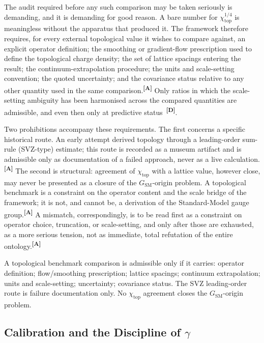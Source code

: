 \documentclass[12pt,a4paper,twoside]{article}
\theoremstyle{plain}
\theoremstyle{definition}
\theoremstyle{remark}
\newcommand{\catmark}[1]{\textsuperscript{\textsf{\textbf{[#1]}}}}
\begin{document}
The audit required before any such comparison may be taken seriously is demanding, and it is demanding for good reason. A bare number for $\chi_{\mathrm{top}}^{1/4}$ is meaningless without the apparatus that produced it. The framework therefore requires, for every external topological value it wishes to compare against, an explicit operator definition; the smoothing or gradient-flow prescription used to define the topological charge density; the set of lattice spacings entering the result; the continuum-extrapolation procedure; the units and scale-setting convention; the quoted uncertainty; and the covariance status relative to any other quantity used in the same comparison.\catmark{A} Only ratios in which the scale-setting ambiguity has been harmonised across the compared quantities are admissible, and even then only at predictive status~\catmark{D}.

Two prohibitions accompany these requirements. The first concerns a specific historical route. An early attempt derived topology through a leading-order sum-rule (SVZ-type) estimate; this route is recorded as a museum artifact and is admissible only as documentation of a failed approach, never as a live calculation.\catmark{A} The second is structural: agreement of $\chi_{\mathrm{top}}$ with a lattice value, however close, may never be presented as a closure of the $G_{\mathrm{SM}}$-origin problem. A topological benchmark is a constraint on the operator content and the scale bridge of the framework; it is not, and cannot be, a derivation of the Standard-Model gauge group.\catmark{A} A mismatch, correspondingly, is to be read first as a constraint on operator choice, truncation, or scale-setting, and only after those are exhausted, as a more serious tension, not as immediate, total refutation of the entire ontology.\catmark{A}

\begin{governancebox}
A topological benchmark comparison is admissible only if it carries: operator definition; flow/smoothing prescription; lattice spacings; continuum extrapolation; units and scale-setting; uncertainty; covariance status. The SVZ leading-order route is failure documentation only. No $\chi_{\mathrm{top}}$ agreement closes the $G_{\mathrm{SM}}$-origin problem.
\end{governancebox}

\subsection{Calibration and the Discipline of \texorpdfstring{$\gamma$}{gamma}}
\label{subsec:gamma-discipline}
\end{document}
